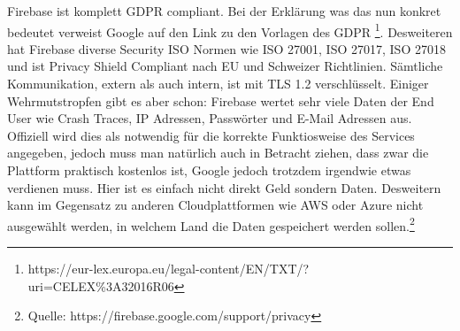 Firebase ist komplett GDPR compliant. Bei der Erklärung was das nun konkret bedeutet verweist Google auf den Link zu den Vorlagen des GDPR \footnote{https://eur-lex.europa.eu/legal-content/EN/TXT/?uri=CELEX\%3A32016R06}. Desweiteren hat Firebase diverse Security ISO Normen wie ISO 27001, ISO 27017, ISO 27018 und ist Privacy Shield Compliant nach EU und Schweizer Richtlinien. Sämtliche Kommunikation, extern als auch intern, ist mit TLS 1.2 verschlüsselt. Einiger Wehrmutstropfen gibt es aber schon: Firebase wertet sehr viele Daten der End User wie Crash Traces, IP Adressen, Passwörter und E-Mail Adressen aus. Offiziell wird dies als notwendig für die korrekte Funktiosweise des Services angegeben, jedoch muss man natürlich auch in Betracht ziehen, dass zwar die Plattform praktisch kostenlos ist, Google jedoch trotzdem irgendwie etwas verdienen muss. Hier ist es einfach nicht direkt Geld sondern Daten. Desweitern kann im Gegensatz zu anderen Cloudplattformen wie AWS oder Azure nicht ausgewählt werden, in welchem Land die Daten gespeichert werden sollen.\footnote{Quelle: https://firebase.google.com/support/privacy}
